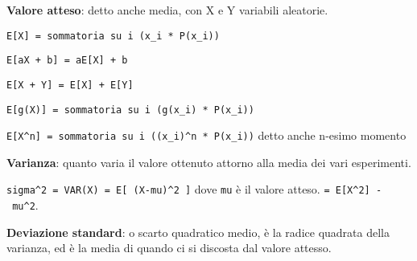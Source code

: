 \textbf{Valore atteso}: detto anche media, con X e Y variabili
aleatorie.

\texttt{E{[}X{]}\ =\ sommatoria\ su\ i\ (x\_i\ *\ P(x\_i))}

\texttt{E{[}aX\ +\ b{]}\ =\ aE{[}X{]}\ +\ b}

\texttt{E{[}X\ +\ Y{]}\ =\ E{[}X{]}\ +\ E{[}Y{]}}

\texttt{E{[}g(X){]}\ =\ sommatoria\ su\ i\ (g(x\_i)\ *\ P(x\_i))}

\texttt{E{[}X\^{}n{]}\ =\ sommatoria\ su\ i\ ((x\_i)\^{}n\ *\ P(x\_i))}
detto anche n-esimo momento

\textbf{Varianza}: quanto varia il valore ottenuto attorno alla media
dei vari esperimenti.

\texttt{sigma\^{}2\ =\ VAR(X)\ =\ E{[}\ (X-mu)\^{}2\ {]}} dove
\texttt{mu} è il valore atteso. \texttt{=\ E{[}X\^{}2{]}\ -\ mu\^{}2}.

\textbf{Deviazione standard}: o scarto quadratico medio, è la radice
quadrata della varianza, ed è la media di quando ci si discosta dal
valore attesso.
